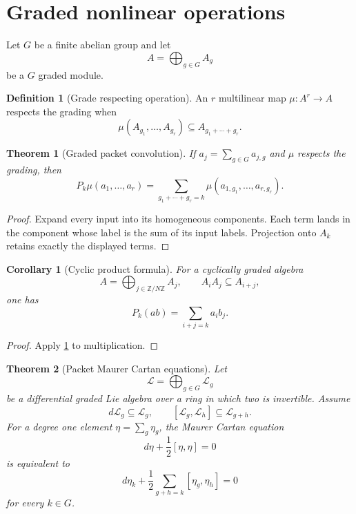 \documentclass{aomart}
\newtheorem{theorem}{Theorem}[section]
\newtheorem{corollary}[corollary]{Corollary}
\theoremstyle{definition}
\newtheorem{definition}[definition]{Definition}
\theoremstyle{remark}
\newcommand{\Lcal}{\mathcal L}
\begin{document}
\section{Graded nonlinear operations}\label{sec:graded_operations}

Let $G$ be a finite abelian group and let
\[
A=\bigoplus_{g\in G}A_g
\]
be a $G$ graded module.

\begin{definition}[Grade respecting operation]\label{def:grade_respecting}
An $r$ multilinear map $\mu:A^r\to A$ respects the grading when
\[
\mu(A_{g_1},\ldots,A_{g_r})
\subseteq
A_{g_1+\cdots+g_r}.
\]
\end{definition}

\begin{theorem}[Graded packet convolution]\label{thm:graded_convolution}
If $a_j=\sum_{g\in G}a_{j,g}$ and $\mu$ respects the grading, then
\[
P_k\mu(a_1,\ldots,a_r)
=
\sum_{g_1+\cdots+g_r=k}
\mu(a_{1,g_1},\ldots,a_{r,g_r}).
\]
\end{theorem}

\begin{proof}
Expand every input into its homogeneous components.  Each term lands in the component whose label is the sum of its input labels.  Projection onto $A_k$ retains exactly the displayed terms.
\end{proof}

\begin{corollary}[Cyclic product formula]\label{cor:cyclic_product}
For a cyclically graded algebra
\[
A=\bigoplus_{j\in\mathbb Z/N\mathbb Z}A_j,
\qquad
A_iA_j\subseteq A_{i+j},
\]
one has
\[
P_k(ab)=
\sum_{i+j=k}a_ib_j.
\]
\end{corollary}

\begin{proof}
Apply \cref{thm:graded_convolution} to multiplication.
\end{proof}

\begin{theorem}[Packet Maurer Cartan equations]\label{thm:packet_mc}
Let
\[
\Lcal=\bigoplus_{g\in G}\Lcal_g
\]
be a differential graded Lie algebra over a ring in which two is invertible.  Assume
\[
d\Lcal_g\subseteq\Lcal_g,
\qquad
[\Lcal_g,\Lcal_h]\subseteq\Lcal_{g+h}.
\]
For a degree one element $\eta=\sum_g\eta_g$, the Maurer Cartan equation
\[
d\eta+\frac12[\eta,\eta]=0
\]
is equivalent to
\[
d\eta_k
+
\frac12
\sum_{g+h=k}[\eta_g,\eta_h]
=0
\]
for every $k\in G$.
\end{theorem}
\end{document}
